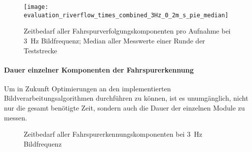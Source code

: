 \begin{figure}[htbp] %
	\centering
	\texttt{[image: evaluation\_riverflow\_times\_combined\_3Hz\_0\_2m\_s\_pie\_median]}
	\caption{Zeitbedarf aller Fahrspurverfolgungskomponenten pro Aufnahme bei \SI{3}{\hertz} Bildfrequenz; Median aller Messwerte einer Runde der Teststrecke}
	\label{fig:evaluation:riverflow:times_combined_3Hz_0_2m_s_pie_median}
\end{figure}


\paragraph{Dauer einzelner Komponenten der Fahrspurerkennung}
Um in Zukunft Optimierungen an den implementierten Bildverarbeitungsalgorithmen durchführen zu können, ist es unumgänglich, nicht nur die gesamt benötigte Zeit, sondern auch die Dauer der einzelnen Module zu messen.

\begin{figure}[htbp] %
\centering
{}
\hfill	
{}
\hfill
\caption{Zeitbedarf aller Fahrspurerkennungskomponenten bei \SI{3}{\hertz} Bildfrequenz}
\end{figure}


